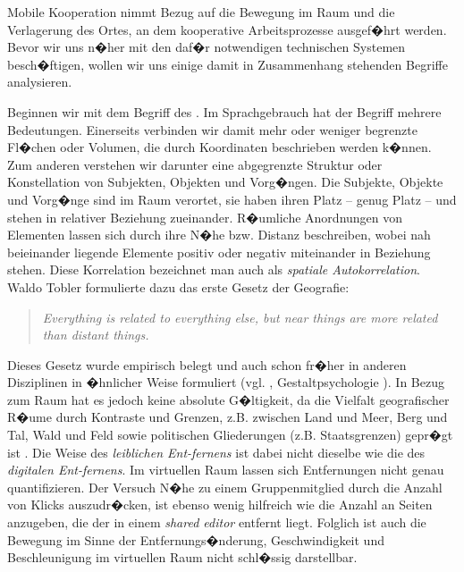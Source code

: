 Mobile Kooperation nimmt Bezug auf die Bewegung im Raum und die Verlagerung des Ortes, an dem kooperative Arbeitsprozesse ausgef�hrt werden.  Bevor wir uns n�her mit den daf�r notwendigen technischen Systemen besch�ftigen, wollen wir uns einige damit in Zusammenhang stehenden Begriffe analysieren.  

Beginnen wir mit dem Begriff des . Im Sprachgebrauch hat der Begriff mehrere Bedeutungen. Einerseits verbinden wir damit mehr oder weniger begrenzte Fl�chen oder Volumen, die durch Koordinaten beschrieben werden k�nnen. Zum anderen verstehen wir darunter eine abgegrenzte Struktur oder Konstellation von Subjekten, Objekten und Vorg�ngen. Die Subjekte, Objekte und Vorg�nge sind im Raum verortet, sie haben ihren Platz -- genug Platz -- und stehen in relativer Beziehung zueinander. R�umliche Anordnungen von Elementen lassen sich durch ihre N�he bzw. Distanz beschreiben, wobei nah beieinander liegende Elemente positiv oder negativ miteinander in Beziehung stehen. Diese Korrelation bezeichnet man auch als \textit{spatiale Autokorrelation}. Waldo Tobler formulierte dazu das erste Gesetz der Geografie: 
\begin{quote}
\textit{Everything is related to everything else, but near things are more related than distant things.} 
\end{quote}
 
Dieses Gesetz wurde empirisch belegt und auch schon fr�her in anderen Disziplinen in �hnlicher Weise formuliert (vgl. , Gestaltpsychologie \cite{Wertheimer1964}). In Bezug zum Raum hat es jedoch keine absolute G�ltigkeit, da die Vielfalt geografischer R�ume durch Kontraste und Grenzen, z.B. zwischen Land und Meer, Berg und Tal, Wald und Feld sowie politischen Gliederungen (z.B. Staatsgrenzen) gepr�gt ist \cite{Keim2010}.  
Die Weise des \emph{leiblichen Ent-fernens} ist dabei nicht dieselbe wie die des \emph{digitalen Ent-fernens}. Im virtuellen Raum lassen sich Entfernungen nicht genau quantifizieren. Der Versuch N�he zu einem Gruppenmitglied durch die Anzahl von Klicks auszudr�cken, ist ebenso wenig hilfreich wie die Anzahl an Seiten anzugeben, die der  in einem \textit{shared editor} entfernt liegt. Folglich ist auch die Bewegung im Sinne der Entfernungs�nderung, Geschwindigkeit und Beschleunigung im virtuellen Raum nicht schl�ssig darstellbar. 

